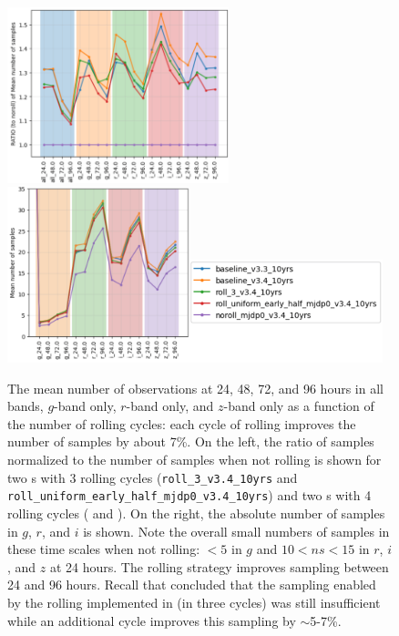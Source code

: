 \begin{figure}
    \centering

    \includegraphics[height=51mm]{figures/rolling_sampling.png}\includegraphics[height=51mm]{figures/rolling_nsamples.png}\includegraphics[height=30mm]{figures/rolling_nsamples_legend.png}
    \caption{The mean number of observations at 24, 48, 72, and 96 hours in all bands, $g$-band only, $r$-band only, and $z$-band only as a function of the number of rolling cycles: each cycle of rolling improves the number of samples by about 7\%. On the left, the ratio of samples normalized to the number of samples when not rolling is shown for two \opsim s with 3 rolling cycles (\texttt{roll\_3\_v3.4\_10yrs} and \texttt{roll\_uniform\_early\_half\_mjdp0\_v3.4\_10yrs}) and two \opsim s with 4 rolling cycles ( and ). On the right, the absolute number of samples in $g$, $r$, and $i$ is shown. Note the overall small numbers of samples in these time scales when not rolling: $<5$ in $g$ and  $10<ns< 15$ in $r$, $i$, and $z$ at 24 hours. The rolling strategy improves sampling between 24 and 96 hours. Recall that  concluded that the sampling enabled by the rolling implemented in  (in three cycles) was still insufficient while an additional cycle improves this sampling by \mbox{$\sim$5-7\%}. 
    }
    \label{fig:rolling_sampling}
\end{figure}

